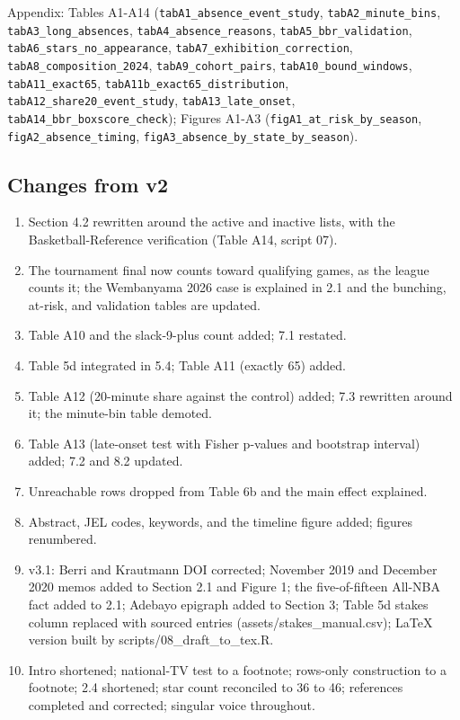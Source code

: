 \documentclass[11pt]{article}
\begin{document}
Appendix: Tables A1-A14 (\texttt{tabA1\_absence\_event\_study}, \texttt{tabA2\_minute\_bins}, \texttt{tabA3\_long\_absences}, \texttt{tabA4\_absence\_reasons}, \texttt{tabA5\_bbr\_validation}, \texttt{tabA6\_stars\_no\_appearance}, \texttt{tabA7\_exhibition\_correction}, \texttt{tabA8\_composition\_2024}, \texttt{tabA9\_cohort\_pairs}, \texttt{tabA10\_bound\_windows}, \texttt{tabA11\_exact65}, \texttt{tabA11b\_exact65\_distribution}, \texttt{tabA12\_share20\_event\_study}, \texttt{tabA13\_late\_onset}, \texttt{tabA14\_bbr\_boxscore\_check}); Figures A1-A3 (\texttt{figA1\_at\_risk\_by\_season}, \texttt{figA2\_absence\_timing}, \texttt{figA3\_absence\_by\_state\_by\_season}).


\subsection*{Changes from v2}


\begin{enumerate}
\item Section 4.2 rewritten around the active and inactive lists, with the Basketball-Reference verification (Table A14, script 07).
\item The tournament final now counts toward qualifying games, as the league counts it; the Wembanyama 2026 case is explained in 2.1 and the bunching, at-risk, and validation tables are updated.
\item Table A10 and the slack-9-plus count added; 7.1 restated.
\item Table 5d integrated in 5.4; Table A11 (exactly 65) added.
\item Table A12 (20-minute share against the control) added; 7.3 rewritten around it; the minute-bin table demoted.
\item Table A13 (late-onset test with Fisher p-values and bootstrap interval) added; 7.2 and 8.2 updated.
\item Unreachable rows dropped from Table 6b and the main effect explained.
\item Abstract, JEL codes, keywords, and the timeline figure added; figures renumbered.
\item v3.1: Berri and Krautmann DOI corrected; November 2019 and December 2020 memos added to Section 2.1 and Figure 1; the five-of-fifteen All-NBA fact added to 2.1; Adebayo epigraph added to Section 3; Table 5d stakes column replaced with sourced entries (assets/stakes\_manual.csv); LaTeX version built by scripts/08\_draft\_to\_tex.R.
\item Intro shortened; national-TV test to a footnote; rows-only construction to a footnote; 2.4 shortened; star count reconciled to 36 to 46; references completed and corrected; singular voice throughout.
\end{enumerate}
\end{document}
